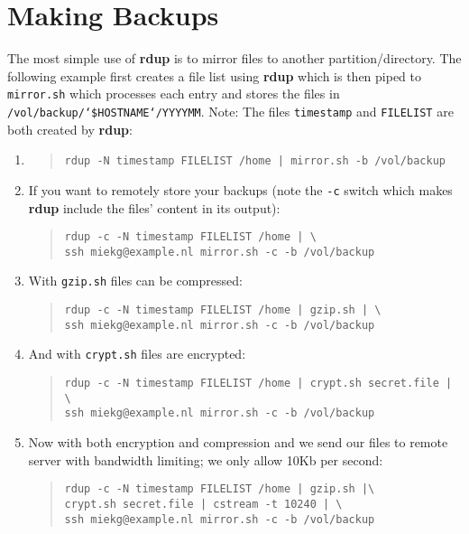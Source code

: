\documentclass[a4paper, openany]{blocksbook}
\newcommand{\rdup}{\textbf{rdup}}
\newcommand{\cmd}[1]{\texttt{#1}}
\begin{document}
\chapter{Making Backups}
The most simple use of \rdup{} is to mirror files to
another partition/directory. The following example first
creates a file list using \rdup{} which is then piped to 
\cmd{mirror.sh} which processes each entry and stores the
files in 
\texttt{/vol/backup/`\$HOSTNAME`/YYYYMM}.
Note: The files \cmd{timestamp} and \cmd{FILELIST} are
both created by \rdup:
\begin{enumerate}
\item
\begin{quote}
\begin{verbatim}
rdup -N timestamp FILELIST /home | mirror.sh -b /vol/backup
\end{verbatim}
\end{quote}

\item
If you want to remotely store your backups (note the \cmd{-c} switch which makes
\rdup{} include the files' content in its output):
\begin{quote}
\begin{verbatim}
rdup -c -N timestamp FILELIST /home | \
ssh miekg@example.nl mirror.sh -c -b /vol/backup
\end{verbatim}
\end{quote}

\item
With \cmd{gzip.sh} files can be compressed:
\begin{quote}
\begin{verbatim}
rdup -c -N timestamp FILELIST /home | gzip.sh | \
ssh miekg@example.nl mirror.sh -c -b /vol/backup
\end{verbatim}
\end{quote}

\item
And with \cmd{crypt.sh} files are encrypted:
\begin{quote}
\begin{verbatim}
rdup -c -N timestamp FILELIST /home | crypt.sh secret.file | \
ssh miekg@example.nl mirror.sh -c -b /vol/backup
\end{verbatim}
\end{quote}

\item
Now with both encryption and compression and we 
send our files to remote server with bandwidth limiting; we
only allow 10Kb per second:
\begin{quote}
\begin{verbatim}
rdup -c -N timestamp FILELIST /home | gzip.sh |\
crypt.sh secret.file | cstream -t 10240 | \
ssh miekg@example.nl mirror.sh -c -b /vol/backup
\end{verbatim}
\end{quote}

\end{enumerate}
\end{document}
